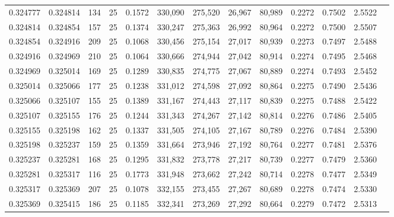 \begin{tabular}{rrrrrrrrrrrrr}
0.324777 & 0.324814 &   134 &  25 &                                     0.1572 & 330,090 & 275,520 &  26,967 &  80,989 & 0.2272 & 0.7502 & 2.5522 \\
0.324814 & 0.324854 &   157 &  25 &                                     0.1374 & 330,247 & 275,363 &  26,992 &  80,964 & 0.2272 & 0.7500 & 2.5507 \\
0.324854 & 0.324916 &   209 &  25 &                                     0.1068 & 330,456 & 275,154 &  27,017 &  80,939 & 0.2273 & 0.7497 & 2.5488 \\
0.324916 & 0.324969 &   210 &  25 &                                     0.1064 & 330,666 & 274,944 &  27,042 &  80,914 & 0.2274 & 0.7495 & 2.5468 \\
0.324969 & 0.325014 &   169 &  25 &                                     0.1289 & 330,835 & 274,775 &  27,067 &  80,889 & 0.2274 & 0.7493 & 2.5452 \\
0.325014 & 0.325066 &   177 &  25 &                                     0.1238 & 331,012 & 274,598 &  27,092 &  80,864 & 0.2275 & 0.7490 & 2.5436 \\
0.325066 & 0.325107 &   155 &  25 &                                     0.1389 & 331,167 & 274,443 &  27,117 &  80,839 & 0.2275 & 0.7488 & 2.5422 \\
0.325107 & 0.325155 &   176 &  25 &                                     0.1244 & 331,343 & 274,267 &  27,142 &  80,814 & 0.2276 & 0.7486 & 2.5405 \\
0.325155 & 0.325198 &   162 &  25 &                                     0.1337 & 331,505 & 274,105 &  27,167 &  80,789 & 0.2276 & 0.7484 & 2.5390 \\
0.325198 & 0.325237 &   159 &  25 &                                     0.1359 & 331,664 & 273,946 &  27,192 &  80,764 & 0.2277 & 0.7481 & 2.5376 \\
0.325237 & 0.325281 &   168 &  25 &                                     0.1295 & 331,832 & 273,778 &  27,217 &  80,739 & 0.2277 & 0.7479 & 2.5360 \\
0.325281 & 0.325317 &   116 &  25 &                                     0.1773 & 331,948 & 273,662 &  27,242 &  80,714 & 0.2278 & 0.7477 & 2.5349 \\
0.325317 & 0.325369 &   207 &  25 &                                     0.1078 & 332,155 & 273,455 &  27,267 &  80,689 & 0.2278 & 0.7474 & 2.5330 \\
0.325369 & 0.325415 &   186 &  25 &                                     0.1185 & 332,341 & 273,269 &  27,292 &  80,664 & 0.2279 & 0.7472 & 2.5313 \\

\end{tabular}
